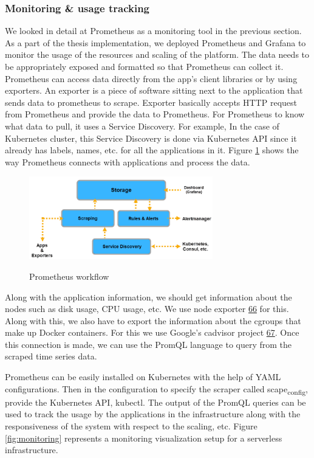 \documentclass[12pt,titlepage]{article}
\begin{document}
\subsubsection{Monitoring \& usage tracking}
\label{sec:org040c809}
We looked in detail at Prometheus as a monitoring tool in the previous section.
As a part of the thesis implementation, we deployed Prometheus and Grafana to
monitor the usage of the resources and scaling of the platform. The data needs
to be appropriately exposed and formatted so that Prometheus can collect it.
Prometheus can access data directly from the app’s client libraries or by using
exporters. An exporter is a piece of software sitting next to the application
that sends data to prometheus to scrape. Exporter basically accepts HTTP request
from Prometheus and provide the data to Prometheus. For Prometheus to know what
data to pull, it uses a Service Discovery. For example, In the case of
Kubernetes cluster, this Service Discovery is done via Kubernetes API since it
already has labels, names, etc. for all the applications in it. Figure
\ref{fig:service_disc} shows the way Prometheus connects with applications and
process the data.

\begin{figure}[!h]
    \caption{Prometheus workflow}
    \centering
    \includegraphics[width=80mm]{./thesis_images/service_disc.png}
    \label{fig:service_disc}
\end{figure}

Along with the application information, we should get information about the
nodes such as disk usage, CPU usage, etc. We use node exporter \hyperref[ref:66]{66} for this. Along
with this, we also have to export the information about the cgroups that make up
Docker containers. For this we use Google's cadvisor project \hyperref[ref:67]{67}. Once this
connection is made, we can use the PromQL language to query from the scraped
time series data.

Prometheus can be easily installed on Kubernetes with the help of YAML
configurations. Then in the configuration to specify the scraper called
scape\textsubscript{config}, provide the Kubernetes API, kubectl. The output of the PromQL
queries can be used to track the usage by the applications in the infrastructure
along with the responsiveness of the system with respect to the scaling, etc.
Figure \ref{fig:monitoring} represents a monitoring visualization setup for a
serverless infrastructure.
\end{document}
